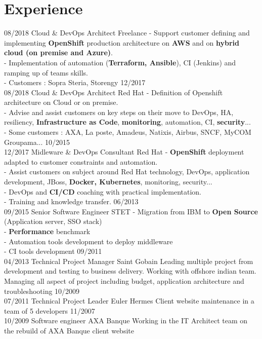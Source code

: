 \documentclass[]{friggeri-cv}
\begin{document}
\section{Experience}
\setlength{\parsepsave}{\parsep}%
\setlength{\parsep}{8.0pt}%
\begin{entrylist}	
	\entryDate
		{08/2018 }
		{Cloud \& DevOps Architect}
		{Freelance}
		{
			- Support customer defining and implementing \textbf{OpenShift} production architecture on \textbf{AWS} and on \textbf{hybrid cloud (on premise and Azure)}.  \\
			- Implementation of automation (\textbf{Terraform, Ansible}), CI (Jenkins) and ramping up of teams skills.  \\	
		 - Customers : Sopra Steria, Storengy
		}
	\entryDate
		{12/2017 \\ 08/2018 }
		{Cloud \& DevOps Architect}
		{Red Hat}
		{	
			- Definition of Openshift architecture on Cloud or on premise. \\
			- Advise and assist customers on key steps on their move to DevOps, HA, resiliency, \textbf{Infrastructure as Code}, \textbf{monitoring}, automation, CI, \textbf{security}... \\
			- Some customers : AXA, La poste, Amadeus, Natixis, Airbus, SNCF, MyCOM Groupama...    
		}
	\entryDate
		{10/2015 \\ 12/2017}
		{Midleware \& DevOps Consultant}
		{Red Hat}
		{ 
			- \textbf{OpenShift} deployment adapted to customer constraints and automation. \\ 
			- Assist customers on subject around Red Hat technology, DevOps, application development, JBoss, \textbf{Docker, Kubernetes}, monitoring, security... \\ 
			- DevOps and \textbf{CI/CD} coaching with practical implementation. \\ 
			- Training and knowledge transfer.
		}	
	\entryDate
	 	{06/2013 \\  09/2015}
		{Senior Software Engineer}
		{STET}
		{ 
			- Migration from IBM to \textbf{Open Source} (Application server, SSO stack)			\\
			- \textbf{Performance} benchmark \\ 
		 	- Automation tools development to deploy middleware \\
		 	- CI tools development 
	 	} 
	\entryDate
		{09/2011 \\ 04/2013}
		{Technical Project Manager}
		{Saint Gobain}
		{
			Leading multiple project from development and testing to business delivery. Working with offshore indian team. Managing all aspect of project including budget, application architecture and troubleshooting }
	\entryDate
		{10/2009 \\ 07/2011}    
		{Technical Project Leader}
		{Euler Hermes}
		{Client website maintenance in a team of 5 developers }
	\entryDate
		{11/2007 \\ 10/2009}
		{Software engineer}
		{AXA Banque}
		{Working in the IT Architect team on the rebuild of AXA Banque client website}
	\end{entrylist}
\setlength{\parsep}{\parsepsave}%
\\
\newpage
\end{document}
